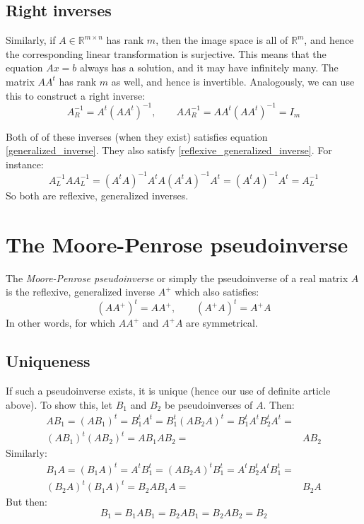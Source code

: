 \documentclass[12pt, a4paper]{article}
\numberwithin{equation}{section}
\begin{document}
\subsection{Right inverses}
Similarly, if $A\in\mathbb{R}^{m\times n}$ has rank $m$, then the image space is all of $\mathbb{R}^m$, and hence the corresponding linear transformation is surjective. This means that the equation $Ax=b$ always has a solution, and it may have infinitely many. The matrix $AA^t$ has rank $m$ as well, and hence is invertible. Analogously, we can use this to construct a right inverse:
\begin{equation}
A^{-1}_R=A^t(AA^t)^{-1},\qquad AA^{-1}_R=AA^t(AA^t)^{-1}=I_m
\end{equation}

Both of of these inverses (when they exist) satisfies equation \ref{generalized_inverse}. They also satisfy \ref{reflexive_generalized_inverse}. For instance:
\begin{equation}
A^{-1}_L AA^{-1}_L=(A^t A)^{-1}A^t A(A^t A)^{-1}A^t=(A^t A)^{-1}A^t=A^{-1}_L
\end{equation}
So both are reflexive, generalized inverses.

\section{The Moore-Penrose pseudoinverse}
The \textit{Moore-Penrose pseudoinverse} or simply the pseudoinverse of a real matrix $A$ is the reflexive, generalized inverse $A^+$ which also satisfies:
\begin{equation}
\label{moore-penrose}
(AA^+)^t=AA^+,\qquad(A^+ A)^t=A^+ A
\end{equation}
In other words, for which $AA^+$ and $A^+ A$ are symmetrical.

\subsection{Uniqueness}
If such a pseudoinverse exists, it is unique (hence our use of definite article above). To show this, let $B_1$ and $B_2$ be pseudoinverses of $A$. Then:
\begin{align}
AB_1=(AB_1)^t=B_1^t A^t=B_1^t(AB_2 A)^t=B_1^t A^t B_2^t A^t=&\\
(AB_1)^t(AB_2)^t=AB_1 AB_2=&AB_2
\end{align}
Similarly:
\begin{align}
B_1A=(B_1A)^t=A^t B_1^t=(AB_2 A)^t B_1^t=A^t B_2^t A^t B_1^t=&\\
(B_2 A)^t(B_1 A)^t=B_2 A B_1 A=&B_2 A
\end{align}
But then:
\begin{equation}
B_1=B_1 AB_1=B_2 AB_1=B_2 AB_2=B_2
\end{equation}
\end{document}
